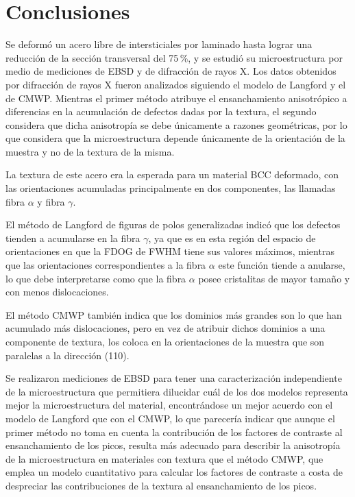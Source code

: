 \section{Conclusiones}\label{S:IFConclusiones}
Se deformó un acero libre de intersticiales por laminado hasta lograr una reducción de la sección transversal del 75\,\%, y se estudió su microestructura por medio de mediciones de EBSD y de difracción de rayos X.
Los datos obtenidos por difracción de rayos X fueron analizados siguiendo el modelo de Langford y el de CMWP.
Mientras el primer método atribuye el ensanchamiento anisotrópico a diferencias en la acumulación de defectos dadas por la textura, el segundo considera que dicha anisotropía se debe únicamente a razones geométricas, por lo que considera que la microestructura depende únicamente de la orientación de la muestra y no de la textura de la misma.

La textura de este acero era la esperada para un material BCC deformado, con las orientaciones acumuladas principalmente en dos componentes, las llamadas fibra $\alpha$ y fibra $\gamma$.

El método de Langford de figuras de polos generalizadas indicó que los defectos tienden a acumularse en la fibra $\gamma$, ya que es en esta región del espacio de orientaciones en que la FDOG de FWHM tiene sus valores máximos, mientras que las orientaciones correspondientes a la fibra $\alpha$ este función tiende a anularse, lo que debe interpretarse como que la fibra $\alpha$ posee cristalitas de mayor tamaño y con menos dislocaciones.

El método CMWP también indica que los dominios más grandes son lo que han acumulado más dislocaciones, pero en vez de atribuir dichos dominios a una componente de textura, los coloca en la orientaciones de la muestra que son paralelas a la dirección (110).

Se realizaron mediciones de EBSD para tener una caracterización independiente de la microestructura que permitiera dilucidar cuál de los dos modelos representa mejor la microestructura del material, encontrándose un mejor acuerdo con el modelo de Langford que con el CMWP, lo que parecería indicar que aunque el primer método no toma en cuenta la contribución de los factores de contraste al ensanchamiento de los picos, resulta más adecuado para describir la anisotropía de la microestructura en materiales con textura que el método CMWP, que emplea un modelo cuantitativo para calcular los factores de contraste a costa de despreciar las contribuciones de la textura al ensanchamiento de los picos.
